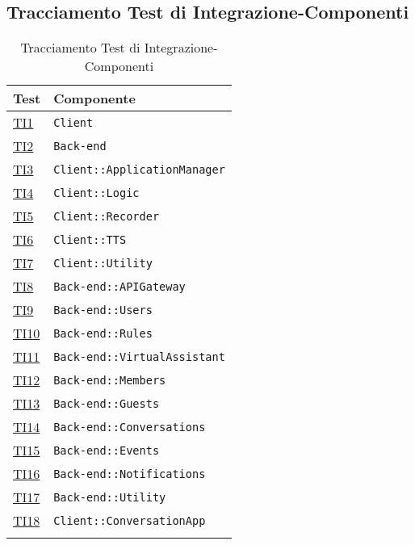 \subsection{Tracciamento Test di Integrazione-Componenti}
\normalsize
\begin{longtable}{|>{\centering}m{3cm}|m{9cm}<{\centering}|}
\hline 
\textbf{Test} & \textbf{Componente}\\
\hline
\endhead
\hyperlink{TI1}{TI1} & \texttt{Client}\\ \hline
\hyperlink{TI2}{TI2} & \texttt{Back-end}\\ \hline
\hyperlink{TI3}{TI3} & \texttt{Client::ApplicationManager}\\ \hline
\hyperlink{TI4}{TI4} & \texttt{Client::Logic}\\ \hline
\hyperlink{TI5}{TI5} & \texttt{Client::Recorder}\\ \hline
\hyperlink{TI6}{TI6} & \texttt{Client::TTS}\\ \hline
\hyperlink{TI7}{TI7} & \texttt{Client::Utility}\\ \hline
\hyperlink{TI8}{TI8} & \texttt{Back-end::APIGateway}\\ \hline
\hyperlink{TI9}{TI9} & \texttt{Back-end::Users}\\ \hline
\hyperlink{TI10}{TI10} & \texttt{Back-end::Rules}\\ \hline
\hyperlink{TI11}{TI11} & \texttt{Back-end::VirtualAssistant}\\ \hline
\hyperlink{TI12}{TI12} & \texttt{Back-end::Members}\\ \hline
\hyperlink{TI13}{TI13} & \texttt{Back-end::Guests}\\ \hline
\hyperlink{TI14}{TI14} & \texttt{Back-end::Conversations}\\ \hline
\hyperlink{TI15}{TI15} & \texttt{Back-end::Events}\\ \hline
\hyperlink{TI16}{TI16} & \texttt{Back-end::Notifications}\\ \hline
\hyperlink{TI17}{TI17} & \texttt{Back-end::Utility}\\ \hline
\hyperlink{TI18}{TI18} & \texttt{Client::ConversationApp}\\ \hline
\caption[Tracciamento Test di Integrazione-Componenti]{Tracciamento Test di Integrazione-Componenti}
\label{tabella:ts-requi}
\end{longtable}
\clearpage

